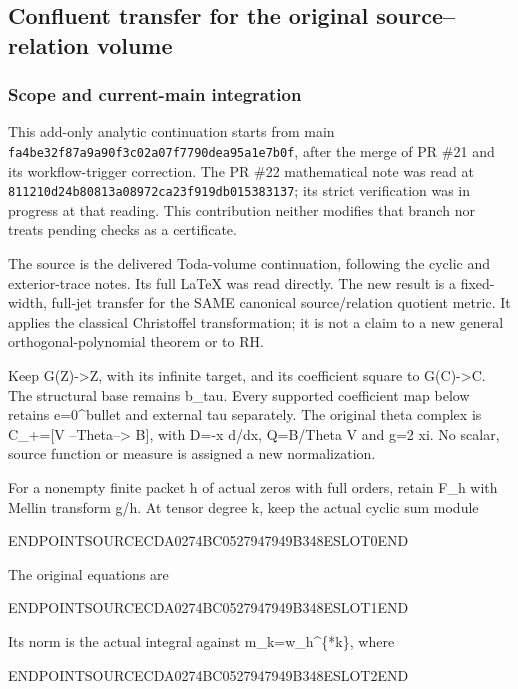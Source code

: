 \subsection{Confluent transfer for the original source--relation volume}\label{endpoint-pr24_original--confluent-transfer-for-the-original-sourcerelation-volume}

\subsubsection{Scope and current-main integration}\label{endpoint-pr24_original--scope-and-current-main-integration}

This add-only analytic continuation starts from main \texttt{fa4be32f87a9a90f3c02a07f7790dea95a1e7b0f}, after the merge of PR \#21 and its workflow-trigger correction. The PR \#22 mathematical note was read at \texttt{811210d24b80813a08972ca23f919db015383137}; its strict verification was in progress at that reading. This contribution neither modifies that branch nor treats pending checks as a certificate.

The source is the delivered Toda-volume continuation, following the cyclic and exterior-trace notes. Its full LaTeX was read directly. The new result is a fixed-width, full-jet transfer for the SAME canonical source/relation quotient metric. It applies the classical Christoffel transformation; it is not a claim to a new general orthogonal-polynomial theorem or to RH.

Keep G(Z)-\textgreater Z, with its infinite target, and its coefficient square to G(C)-\textgreater C. The structural base remains b\_tau. Every supported coefficient map below retains e=0\^{}bullet and external tau separately. The original theta complex is C\_+={[}V --Theta--\textgreater{} B{]}, with D=-x d/dx, Q=B/Theta V and g=2 xi. No scalar, source function or measure is assigned a new normalization.

For a nonempty finite packet h of actual zeros with full orders, retain F\_h with Mellin transform g/h. At tensor degree k, keep the actual cyclic sum module

ENDPOINTSOURCECDA0274BC0527947949B348ESLOT0END

The original equations are

ENDPOINTSOURCECDA0274BC0527947949B348ESLOT1END

Its norm is the actual integral against m\_k=w\_h\^{}\{*k\}, where

ENDPOINTSOURCECDA0274BC0527947949B348ESLOT2END

